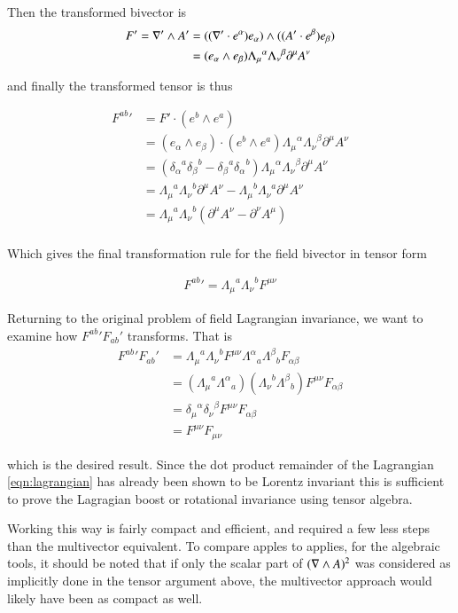 \documentclass{article}
\begin{document}
Then the transformed bivector is
\begin{align*}
F' = \nabla' \wedge A'
&= ((\nabla' \cdot e^\alpha) e_\alpha) \wedge ((A' \cdot e^\beta) e_\beta) \\
&= (e_\alpha \wedge e_\beta) {\Lambda_\mu}^\alpha {\Lambda_\nu}^\beta \partial^\mu A^\nu \\
\end{align*}

and finally the transformed tensor is thus

\begin{align*}
{F^{ab}}'
&= F' \cdot (e^b \wedge e^a) \\
&= (e_\alpha \wedge e_\beta) \cdot (e^b \wedge e^a) {\Lambda_\mu}^\alpha {\Lambda_\nu}^\beta \partial^\mu A^\nu \\
&= ( {\delta_\alpha}^a {\delta_\beta}^b - {\delta_\beta}^a {\delta_\alpha}^b ) {\Lambda_\mu}^\alpha {\Lambda_\nu}^\beta \partial^\mu A^\nu \\
&= {\Lambda_\mu}^a {\Lambda_\nu}^b \partial^\mu A^\nu
-{\Lambda_\mu}^b {\Lambda_\nu}^a \partial^\mu A^\nu \\
&= {\Lambda_\mu}^a {\Lambda_\nu}^b ( \partial^\mu A^\nu -\partial^\nu A^\mu ) \\
\end{align*}

Which gives the final transformation rule for the field bivector in tensor form

\begin{align}
{F^{ab}}' = {\Lambda_\mu}^a {\Lambda_\nu}^b F^{\mu\nu}
\end{align}

Returning to the original problem of field Lagrangian invariance, we want to examine how ${F^{ab}}' {F_{ab}}'$ transforms.  That is
\begin{align}
{F^{ab}}' {F_{ab}}'
&= {\Lambda_\mu}^a {\Lambda_\nu}^b F^{\mu\nu} {\Lambda^\alpha}_a {\Lambda^\beta}_b F_{\alpha\beta} \\
&= ({\Lambda_\mu}^a {\Lambda^\alpha}_a) ({\Lambda_\nu}^b {\Lambda^\beta}_b) F^{\mu\nu} F_{\alpha\beta} \\
&= {\delta_\mu}^\alpha {\delta_\nu}^\beta F^{\mu\nu} F_{\alpha\beta} \\
&= F^{\mu\nu} F_{\mu\nu}
\end{align}

which is the desired result.  Since the dot product remainder of the Lagrangian \ref{eqn:lagrangian}
has already been shown to be Lorentz invariant this is sufficient to prove the Lagragian boost or rotational invariance using tensor algebra.

Working this way is fairly compact and efficient, and required a few less steps than the multivector equivalent.  To compare apples to applies,
for the algebraic tools, it should be noted that if only the 
scalar part of $(\nabla \wedge A)^2$ was considered as implicitly done in the tensor argument above, the multivector approach would likely have been as 
compact as well.



\end{document}
